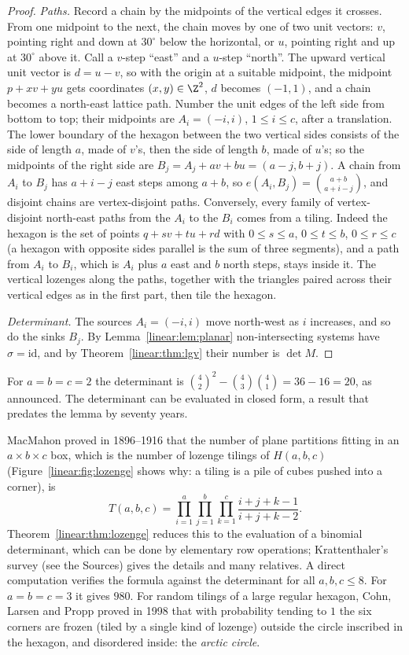 \begin{proof}
\emph{Paths.} Record a chain by the midpoints of the vertical edges it crosses. From one midpoint to the next, the chain
moves by one of two unit vectors: $v$, pointing right and down at $30^\circ$ below the horizontal, or $u$, pointing right
and up at $30^\circ$ above it. Call a $v$-step ``east'' and a $u$-step ``north''. The upward vertical unit vector is
$d=u-v$, so with the origin at a suitable midpoint, the midpoint $p+xv+yu$ gets coordinates $(x,y)\in\Z^2$, $d$ becomes
$(-1,1)$, and a chain becomes a north-east lattice path. Number the unit edges of the left side from bottom to top; their
midpoints are $A_i=(-i,i)$, $1\le i\le c$, after a translation. The lower boundary of the hexagon between the two
vertical sides consists of the side of length $a$, made of $v$'s, then the side of length $b$, made of $u$'s; so the
midpoints of the right side are $B_j=A_j+av+bu=(a-j,b+j)$. A chain from $A_i$ to $B_j$ has $a+i-j$ east steps among
$a+b$, so $e(A_i,B_j)=\binom{a+b}{a+i-j}$, and disjoint chains are vertex-disjoint paths. Conversely, every family of
vertex-disjoint north-east paths from the $A_i$ to the $B_i$ comes from a tiling. Indeed the hexagon is the set of points
$q+sv+tu+rd$ with $0\le s\le a$, $0\le t\le b$, $0\le r\le c$ (a hexagon with opposite sides parallel is the sum of three
segments), and a path from $A_i$ to $B_i$, which is $A_i$ plus $a$ east and $b$ north steps, stays inside it. The
vertical lozenges along the paths, together with the triangles paired across their vertical edges as in the first part,
then tile the hexagon.

\emph{Determinant.} The sources $A_i=(-i,i)$ move north-west as $i$ increases, and so do the sinks $B_j$. By
Lemma~\ref{linear:lem:planar} non-intersecting systems have $\sigma=\mathrm{id}$, and by Theorem~\ref{linear:thm:lgv} their number is
$\det M$.
\end{proof}

For $a=b=c=2$ the determinant is $\binom42^2-\binom43\binom41=36-16=20$, as announced. The determinant can be evaluated in
closed form, a result that predates the lemma by seventy years.

\begin{remark}
MacMahon proved in 1896--1916 that the number of plane partitions fitting in an $a\times b\times c$ box, which is the
number of lozenge tilings of $H(a,b,c)$ (Figure~\ref{linear:fig:lozenge} shows why: a tiling is a pile of cubes pushed into a
corner), is
\[
T(a,b,c)=\prod_{i=1}^a\prod_{j=1}^b\prod_{k=1}^c\frac{i+j+k-1}{i+j+k-2}.
\]
Theorem~\ref{linear:thm:lozenge} reduces this to the evaluation of a binomial determinant, which can be done by elementary row
operations; Krattenthaler's survey (see the Sources) gives the details and many relatives. A direct computation verifies the
formula against the determinant for all $a,b,c\le8$. For $a=b=c=3$ it gives $980$. For random tilings of a large regular
hexagon, Cohn, Larsen and Propp proved in 1998 that with probability tending to $1$ the six corners are frozen (tiled by
a single kind of lozenge) outside the circle inscribed in the hexagon, and disordered inside: the \emph{arctic circle}.
\end{remark}

